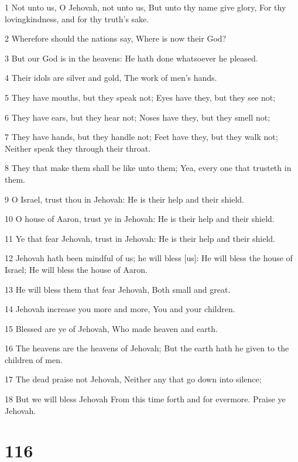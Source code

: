 \par 1 Not unto us, O Jehovah, not unto us, But unto thy name give glory, For thy lovingkindness, and for thy truth's sake.
\par 2 Wherefore should the nations say, Where is now their God?
\par 3 But our God is in the heavens: He hath done whatsoever he pleased.
\par 4 Their idols are silver and gold, The work of men's hands.
\par 5 They have mouths, but they speak not; Eyes have they, but they see not;
\par 6 They have ears, but they hear not; Noses have they, but they smell not;
\par 7 They have hands, but they handle not; Feet have they, but they walk not; Neither speak they through their throat.
\par 8 They that make them shall be like unto them; Yea, every one that trusteth in them.
\par 9 O Israel, trust thou in Jehovah: He is their help and their shield.
\par 10 O house of Aaron, trust ye in Jehovah: He is their help and their shield.
\par 11 Ye that fear Jehovah, trust in Jehovah: He is their help and their shield.
\par 12 Jehovah hath been mindful of us; he will bless [us]: He will bless the house of Israel; He will bless the house of Aaron.
\par 13 He will bless them that fear Jehovah, Both small and great.
\par 14 Jehovah increase you more and more, You and your children.
\par 15 Blessed are ye of Jehovah, Who made heaven and earth.
\par 16 The heavens are the heavens of Jehovah; But the earth hath he given to the children of men.
\par 17 The dead praise not Jehovah, Neither any that go down into silence;
\par 18 But we will bless Jehovah From this time forth and for evermore. Praise ye Jehovah.

\chapter{116}

